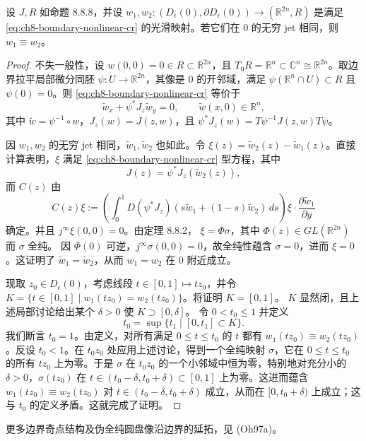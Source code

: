 \begin{theorem}\label{thm:ch8-boundary-unique-continuation}
设 $J,R$ 如命题 8.8.8，并设
$w_1,w_2:(D_\epsilon(0),\partial D_\epsilon(0))\to(\mathbb R^{2n},R)$
是满足 \eqref{eq:ch8-boundary-nonlinear-cr} 的光滑映射。若它们在 $0$ 的无穷 jet 相同，则
$w_1\equiv w_2$。
\end{theorem}
\begin{proof}
不失一般性，设 $w(0,0)=0\in R\subset\mathbb R^{2n}$，且
$T_0R=\mathbb R^n\subset\mathbb C^n\cong\mathbb R^{2n}$。取边界拉平局部微分同胚
$\psi:U\to\mathbb R^{2n}$，其像是 $0$ 的开邻域，满足
$\psi(\mathbb R^n\cap U)\subset R$ 且 $\psi(0)=0$。则
\eqref{eq:ch8-boundary-nonlinear-cr} 等价于
\[
 \widetilde w_x+\psi^*J_z\widetilde w_y=0,\qquad
 \widetilde w(x,0)\in\mathbb R^n,
\]
其中 $\widetilde w=\psi^{-1}\circ w$，$J_z(w)=J(z,w)$，且
$\psi^*J_z(w)=T\psi^{-1}J(z,w)T\psi$。

因 $w_1,w_2$ 的无穷 jet 相同，$\widetilde w_1,\widetilde w_2$ 也如此。令
$\xi(z)=\widetilde w_2(z)-\widetilde w_1(z)$。直接计算表明，$\xi$ 满足
\eqref{eq:ch8-boundary-nonlinear-cr} 型方程，其中
\[
 J(z)=\psi^*J_z(\widetilde w_2(z)),
\]
而 $C(z)$ 由
\[
 C(z)\xi:=\left(\int_0^1D(\psi^*J_z)
 (s\widetilde w_1+(1-s)\widetilde w_2)\,ds\right)\xi\cdot
 \frac{\partial\widetilde w_1}{\partial y}
\]
确定。并且 $j^\infty\xi(0,0)=0$。由定理 8.8.2，
$\xi=\Phi\sigma$，其中 $\Phi(z)\in GL(\mathbb R^{2n})$ 而 $\sigma$ 全纯。
因 $\Phi(0)$ 可逆，$j^\infty\sigma(0,0)=0$，故全纯性蕴含
$\sigma=0$，进而 $\xi=0$。这证明了 $\widetilde w_1=\widetilde w_2$，从而
$w_1=w_2$ 在 $0$ 附近成立。

现取 $z_0\in D_\epsilon(0)$，考虑线段 $t\in[0,1]\mapsto tz_0$，并令
$K=\{t\in[0,1]\mid w_1(tz_0)=w_2(tz_0)\}$。将证明 $K=[0,1]$。
$K$ 显然闭，且上述局部讨论给出某个 $\delta>0$ 使 $K\supset[0,\delta]$。
令 $0<t_0\leq1$ 并定义
\[
 t_0=\sup\{t_1\mid[0,t_1]\subset K\}.
\]
我们断言 $t_0=1$。由定义，对所有满足 $0\leq t\leq t_0$ 的 $t$ 都有
$w_1(tz_0)\equiv w_2(tz_0)$。反设 $t_0<1$。在 $t_0z_0$ 处应用上述讨论，得到一个全纯映射 $\sigma$，它在
$0\leq t\leq t_0$ 的所有 $tz_0$ 上为零。于是 $\sigma$ 在 $t_0z_0$ 的一个小邻域中恒为零，特别地对充分小的
$\delta>0$，$\sigma(tz_0)$ 在 $t\in(t_0-\delta,t_0+\delta)\subset[0,1]$ 上为零。这进而蕴含
$w_1(tz_0)\equiv w_2(tz_0)$ 对 $t\in(t_0-\delta,t_0+\delta)$ 成立，从而在
$[0,t_0+\delta)$ 上成立；这与 $t_0$ 的定义矛盾。这就完成了证明。
\end{proof}
更多边界奇点结构及伪全纯圆盘像沿边界的延拓，见 (Oh97a)。
